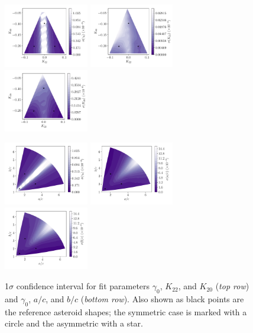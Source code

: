 \documentclass[fleqn,usenatbib]{mnras}
\begin{document}
\begin{figure}
  \includegraphics[width=0.33\textwidth]{figs/probe-space-theta-1-sigma.pdf}\hfill
  \includegraphics[width=0.33\textwidth]{figs/probe-space-theta-2-sigma.pdf}\hfill
  \includegraphics[width=0.33\textwidth]{figs/probe-space-theta-3-sigma.pdf}

  \includegraphics[width=0.33\textwidth]{figs/probe-space-ab-1-sigma.pdf}\hfill
  \includegraphics[width=0.33\textwidth]{figs/probe-space-ab-a-sigma.pdf}\hfill
  \includegraphics[width=0.33\textwidth]{figs/probe-space-ab-b-sigma.pdf}

  \caption{1$\sigma$ confidence interval for fit parameters $\gamma_0$, $K_{22}$, and $K_{20}$ (\textit{top row}) and $\gamma_0$, $a/c$, and $b/c$ (\textit{bottom row}). Also shown as black points are the reference asteroid shapes; the symmetric case is marked with a circle and the asymmetric with a star.}
  \label{fig:scan-space-sigma}
\end{figure}
\end{document}
